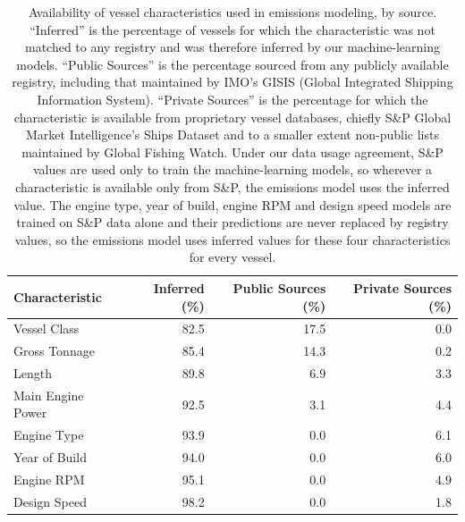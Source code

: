 \documentclass[lineno,pdflatex,sn-nature]{sn-jnl}
\begin{document}
\begin{table}[htbp]
  \centering
  \small
  \caption{Availability of vessel characteristics used in emissions modeling, by source.
  ``Inferred'' is the percentage of vessels for which the characteristic was not matched to any registry and was therefore inferred by our machine-learning models. ``Public Sources'' is the percentage sourced from any publicly available registry, including that maintained by IMO's GISIS (Global Integrated Shipping Information System). ``Private Sources'' is the percentage for which the characteristic is available from proprietary vessel databases, chiefly S\&P Global Market Intelligence's Ships Dataset and to a smaller extent non-public lists maintained by Global Fishing Watch. Under our data usage agreement, S\&P values are used only to train the machine-learning models, so wherever a characteristic is available only from S\&P, the emissions model uses the inferred value. The engine type, year of build, engine RPM and design speed models are trained on S\&P data alone and their predictions are never replaced by registry values, so the emissions model uses inferred values for these four characteristics for every vessel.}\label{tab:characteristic-availability}
  \begin{tabular}{@{}lrrr@{}}
    \toprule
    Characteristic & Inferred (\%) & Public Sources (\%) & Private Sources (\%) \\
    \midrule
    Vessel Class      & 82.5 & 17.5 & 0.0 \\
    Gross Tonnage     & 85.4 & 14.3 & 0.2 \\
    Length            & 89.8 & 6.9  & 3.3 \\
    Main Engine Power & 92.5 & 3.1  & 4.4 \\
    Engine Type       & 93.9 & 0.0  & 6.1 \\
    Year of Build     & 94.0 & 0.0  & 6.0 \\
    Engine RPM        & 95.1 & 0.0  & 4.9 \\
    Design Speed      & 98.2 & 0.0  & 1.8 \\
    \bottomrule
  \end{tabular}
\end{table}
\FloatBarrier
\end{document}
